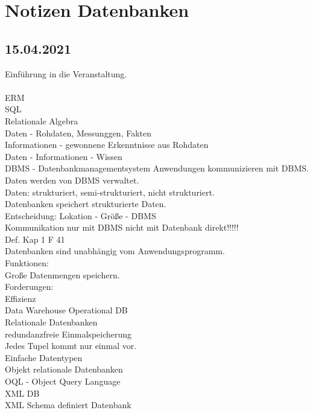 \documentclass{article}
\begin{document}
	\section*{Notizen Datenbanken}
	\subsection*{15.04.2021}
	Einführung in die Veranstaltung. \\ \\
	ERM \\
	SQL \\
	Relationale Algebra \\
	Daten - Rohdaten, Messunggen, Fakten \\
	Informationen - gewonnene Erkenntnisse aus Rohdaten \\
	Daten - Informationen - Wissen \\
	DBMS - Datenbankmanagementsystem
	Anwendungen kommunizieren mit DBMS. \\
	Daten werden von DBMS verwaltet. \\
	Daten: strukturiert, semi-strukturiert, nicht strukturiert. \\
	Datenbanken speichert strukturierte Daten. \\
	Entscheidung:	Lokation - Größe - DBMS  \\
	Kommunikation nur mit DBMS nicht mit Datenbank direkt!!!!! \\
	Def. Kap 1 F 41 \\
	Datenbanken sind unabhängig vom Anwendungsprogramm. \\
	Funktionen: \\
	Große Datenmengen speichern. \\
	Forderungen: \\
	Effizienz  \\
	Data Warehouse Operational DB \\
	Relationale Datenbanken \\
	redundanzfreie Einmalspeicherung \\
	Jedes Tupel kommt nur einmal vor. \\
	Einfache Datentypen \\
	Objekt relationale Datenbanken \\
	OQL - Object Query Language \\
	XML DB \\
	XML Schema definiert Datenbank \\
\end{document}
